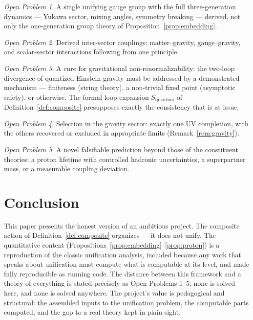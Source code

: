 \documentclass[11pt]{article}
\theoremstyle{remark}
\newtheorem{openproblem}{Open Problem}
\begin{document}
\begin{openproblem}
A single unifying gauge group with the full three-generation dynamics
--- Yukawa sector, mixing angles, symmetry breaking --- derived, not
only the one-generation group theory of
Proposition~\ref{prop:embedding}.
\end{openproblem}

\begin{openproblem}
Derived inter-sector couplings: matter--gravity, gauge--gravity, and
scalar-sector interactions following from one principle.
\end{openproblem}

\begin{openproblem}
A cure for gravitational non-renormalizability: the two-loop divergence
of quantized Einstein gravity \cite{goroff-sagnotti,thooft-veltman}
must be addressed by a demonstrated mechanism --- finiteness (string
theory), a non-trivial fixed point (asymptotic safety), or otherwise.
The formal loop expansion $S_{\mathrm{quantum}}$ of
Definition~\ref{def:composite} presupposes exactly the consistency that
is at issue.
\end{openproblem}

\begin{openproblem}
Selection in the gravity sector: exactly one UV completion, with the
others recovered or excluded in appropriate limits
(Remark~\ref{rem:gravity}).
\end{openproblem}

\begin{openproblem}
A novel falsifiable prediction beyond those of the constituent
theories: a proton lifetime with controlled hadronic uncertainties, a
superpartner mass, or a measurable coupling deviation.
\end{openproblem}

\section{Conclusion}

This paper presents the honest version of an ambitious project. The
composite action of Definition~\ref{def:composite} organizes --- it
does not unify. The quantitative content
(Propositions~\ref{prop:embedding}--\ref{prop:proton}) is a
reproduction of the classic unification analysis, included because any
work that speaks about unification must compute what is computable at
its level, and made fully reproducible as running code. The distance
between this framework and a theory of everything is stated precisely
as Open Problems 1--5; none is solved here, and none is solved
anywhere. The project's value is pedagogical and structural: the
assembled inputs to the unification problem, the computable parts
computed, and the gap to a real theory kept in plain sight.
\end{document}
